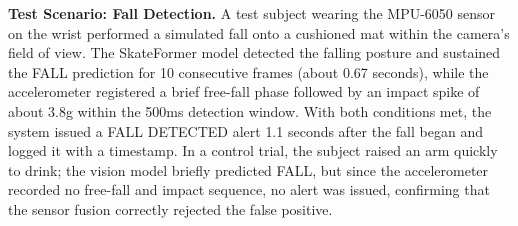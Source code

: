 \textbf{Test Scenario: Fall Detection.} A test subject wearing the MPU-6050 sensor on the wrist performed a simulated fall onto a cushioned mat within the camera's field of view. The SkateFormer model detected the falling posture and sustained the FALL prediction for 10 consecutive frames (about 0.67 seconds), while the accelerometer registered a brief free-fall phase followed by an impact spike of about 3.8g within the 500ms detection window. With both conditions met, the system issued a FALL DETECTED alert 1.1 seconds after the fall began and logged it with a timestamp. In a control trial, the subject raised an arm quickly to drink; the vision model briefly predicted FALL, but since the accelerometer recorded no free-fall and impact sequence, no alert was issued, confirming that the sensor fusion correctly rejected the false positive.
